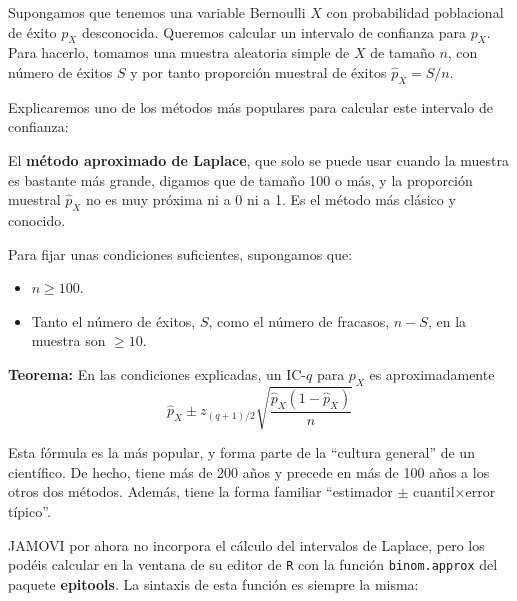 \documentclass[
  spanish,
  letterpaper,
  DIV=11,
  numbers=noendperiod]{scrreprt}
\providecommand{\tightlist}{%
  \setlength{\itemsep}{0pt}\setlength{\parskip}{0pt}}
\begin{document}
Supongamos que tenemos una variable Bernoulli \(X\) con probabilidad
poblacional de éxito \(p_X\) desconocida. Queremos calcular un intervalo
de confianza para \(p_X\). Para hacerlo, tomamos una muestra aleatoria
simple de \(X\) de tamaño \(n\), con número de éxitos \(S\) y por tanto
proporción muestral de éxitos \(\widehat{p}_{X}=S/n\).

Explicaremos uno de los métodos más populares para calcular este
intervalo de confianza:

\begin{tcolorbox}[enhanced jigsaw, arc=.35mm, bottomrule=.15mm, bottomtitle=1mm, breakable, colback=white, colbacktitle=quarto-callout-important-color!10!white, colframe=quarto-callout-important-color-frame, coltitle=black, left=2mm, leftrule=.75mm, opacityback=0, opacitybacktitle=0.6, rightrule=.15mm, title=\textcolor{quarto-callout-important-color}{\faExclamation}\hspace{0.5em}{Importante}, titlerule=0mm, toprule=.15mm, toptitle=1mm]

El \textbf{método aproximado de Laplace}, que solo se puede usar cuando
la muestra es bastante más grande, digamos que de tamaño 100 o más, y la
proporción muestral \(\widehat{p}_{X}\) no es muy próxima ni a 0 ni a 1.
Es el método más clásico y conocido.

\end{tcolorbox}

Para fijar unas condiciones suficientes, supongamos que:

\begin{itemize}
\tightlist
\item
  \(n\geqslant 100\).
\item
  Tanto el número de éxitos, \(S\), como el número de fracasos, \(n-S\),
  en la muestra son \(\geqslant 10\).
\end{itemize}

\textbf{Teorema:} En las condiciones explicadas, un IC-\(q\) para
\(p_X\) es aproximadamente \[
\widehat{p}_{X}\pm z_{(q+1)/2}\sqrt{\frac{\widehat{p}_{X}
(1-\widehat{p}_{X})}{n}}
\]

Esta fórmula es la más popular, y forma parte de la ``cultura general''
de un científico. De hecho, tiene más de 200 años y precede en más de
100 años a los otros dos métodos. Además, tiene la forma familiar
``estimador \(\pm\) cuantil\(\times\)error típico''.

JAMOVI por ahora no incorpora el cálculo del intervalos de Laplace, pero
los podéis calcular en la ventana de su editor de \texttt{R} con la
función \texttt{binom.approx} del paquete \textbf{epitools}. La sintaxis
de esta función es siempre la misma:
\end{document}
